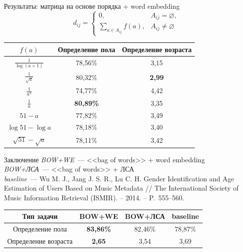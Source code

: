 \documentclass{beamer}
\newcommand{\prevGender}{78,87\%}
\newcommand{\prevAge}{3,69}
\begin{document}
\begin{frame}{Результаты: матрица на основе порядка + word embedding}
    \[d_{ij} = \begin{cases}
              0,& A_{ij} = \varnothing,\\
              \sum\limits_{a \in A_{ij}}{f(a)},& A_{ij} \ne \varnothing
          \end{cases}\]
\begin{table}[!h]
\centering
\begin{tabular}{|c|c|c|}\hline
    \boldmath$f(a)$ & \textbf{Определение пола} & \textbf{Определение возраста} \\\hline
    $\frac{1}{\log(a + 1)}$ & 78,56\% & 3,15 \\\hline
    $\frac{1}{\sqrt{a}}$ & 80,32\% & \textbf{2,99} \\\hline
    $\frac{1}{a^2}$ & 74,77\% & 4,42 \\\hline
    $\frac{1}{a}$ & \textbf{80,89\%} & 3,35 \\\hline
    $51 - a$ & 77,82\% & 3,49 \\\hline
    $\log{51} - \log{a}$ & 78,18\% & 3,40 \\\hline
    $\sqrt{51} - \sqrt{a}$ & 78,11\% & 3,42 \\\hline
\end{tabular}
\end{table}
\end{frame}

\begin{frame}{Заключение}
    \textit{BOW+WE}~--- <<bag of words>> + word embedding \\
    \textit{BOW+ЛСА}~--- <<bag of words>> + ЛСА \\
    \textit{baseline}~--- Wu M. J.,
        Jang J. S. R., Lu C. H. Gender Identification
        and Age Estimation of Users Based on Music 
        Metadata // The International Society of Music Information Retrieval (ISMIR). – 2014. – P.~555--560.
    \begin{table}[h!]
    \centering
    \begin{tabular}{|c|c|c|c|}
    \hline
    \textbf{Тип задачи} & \textbf{BOW+WE} & \textbf{BOW+ЛСА} & \textbf{baseline} \tabularnewline
    \hline
    Определение пола & \textbf{83,86\%} & 82,46\% & \prevGender \tabularnewline
    \hline
    Определение возраста & \textbf{2,65} & 3,54 & \prevAge \tabularnewline
    \hline
    \end{tabular}
    \label{tab:total_results}
    \end{table}
\end{frame}

\begin{frame}
    \titlepage
\end{frame}
\end{document}
